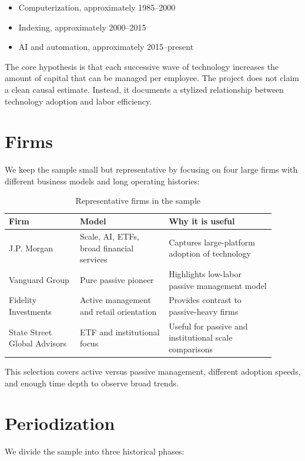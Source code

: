 \documentclass{article}
\begin{document}
\begin{itemize}
  \item Computerization, approximately 1985--2000
  \item Indexing, approximately 2000--2015
  \item AI and automation, approximately 2015--present
\end{itemize}

The core hypothesis is that each successive wave of technology increases the amount of capital that can be managed per employee. The project does not claim a clean causal estimate. Instead, it documents a stylized relationship between technology adoption and labor efficiency.

\section{Firms}
We keep the sample small but representative by focusing on four large firms with different business models and long operating histories:

\begin{table}[h]
  \centering
  \caption{Representative firms in the sample}
  \begin{tabular}{>{\raggedright\arraybackslash}p{0.24\linewidth} >{\raggedright\arraybackslash}p{0.30\linewidth} >{\raggedright\arraybackslash}p{0.36\linewidth}}
    \toprule
    Firm & Model & Why it is useful \\
    \midrule
    J.P. Morgan & Scale, AI, ETFs, broad financial services & Captures large-platform adoption of technology \\
    Vanguard Group & Pure passive pioneer & Highlights low-labor passive management model \\
    Fidelity Investments & Active management and retail orientation & Provides contrast to passive-heavy firms \\
    State Street Global Advisors & ETF and institutional focus & Useful for passive and institutional scale comparisons \\
    \bottomrule
  \end{tabular}
\end{table}

This selection covers active versus passive management, different adoption speeds, and enough time depth to observe broad trends.

\section{Periodization}
We divide the sample into three historical phases:
\end{document}
